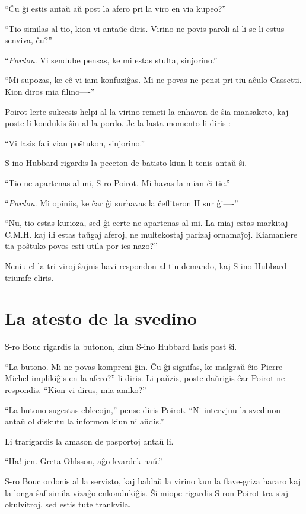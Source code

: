 ``Ĉu ĝi estis antaŭ aŭ post la afero pri la viro en via kupeo?''

``Tio similas al tio, kion vi antaŭe diris. Virino ne povis paroli al li se li estus senviva, ĉu?''

``\emph{Pardon}. Vi sendube pensas, ke mi estas stulta, sinjorino.''

``Mi supozas, ke eĉ vi iam konfuziĝas. Mi ne povas ne pensi pri tiu aĉulo Cassetti. Kion diros mia filino----''

Poirot lerte sukcesis helpi al la virino remeti la enhavon de ŝia mansaketo, kaj poste li kondukis ŝin al la pordo. Je la lasta momento li diris :

``Vi lasis fali vian poŝtukon, sinjorino.''

S-ino Hubbard rigardis la peceton de batisto kiun li tenis antaŭ ŝi.

``Tio ne apartenas al mi, S-ro Poirot. Mi havas la mian ĉi tie.''

``\emph{Pardon}. Mi opiniis, ke ĉar ĝi surhavas la ĉefliteron H sur ĝi----''

``Nu, tio estas kurioza, sed ĝi certe ne apartenas al mi. La miaj estas markitaj C.M.H. kaj ili estas taŭgaj aferoj, ne multekostaj parizaj ornamaĵoj. Kiamaniere tia poŝtuko povos esti utila por ies nazo?''

Neniu el la tri viroj ŝajnis havi respondon al tiu demando, kaj S-ino Hubbard triumfe eliris.

\chapter[La atesto de la svedino]{La atesto de la svedino}


S-ro Bouc rigardis la butonon, kiun S-ino Hubbard lasis post ŝi.

``La butono. Mi ne povas kompreni ĝin. Ĉu ĝi signifas, ke malgraŭ ĉio Pierre Michel implikiĝis en la afero?'' li diris. Li paŭzis, poste daŭrigis ĉar Poirot ne respondis. ``Kion vi dirus, mia amiko?''

``La butono sugestas eblecojn,'' pense diris Poirot. ``Ni intervjuu la svedinon antaŭ ol diskutu la informon kiun ni aŭdis.''

Li trarigardis la amason de pasportoj antaŭ li.

``Ha! jen. Greta Ohlsson, aĝo kvardek naŭ.''

S-ro Bouc ordonis al la servisto, kaj baldaŭ la virino kun la flave-griza hararo kaj la longa ŝaf-simila vizaĝo enkondukiĝis. Ŝi miope rigardis S-ron Poirot tra siaj okulvitroj, sed estis tute trankvila.

